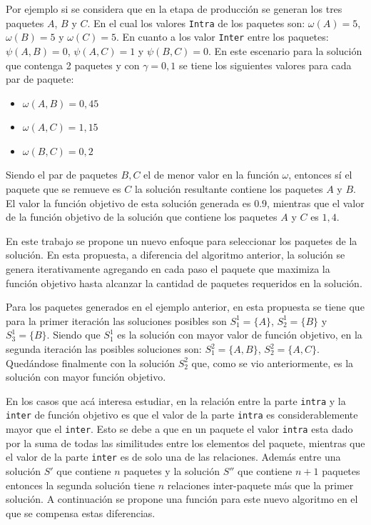 Por ejemplo si se considera que en la etapa de producción se generan los tres paquetes $A$, $B$ y $C$. En el cual los valores \texttt{Intra} de los paquetes son: $\omega(A) = 5$, $\omega(B) = 5$ y $\omega(C) = 5$. En cuanto a los valor \texttt{Inter} entre los paquetes:$\psi(A,B) = 0$, $\psi(A,C) = 1$ y $\psi(B,C) = 0$. En este escenario para la solución que contenga 2 paquetes y con $\gamma=0,1$ se tiene los siguientes valores para cada par de paquete:
\begin{itemize}
	\item $\omega(A,B) = 0,45$
	\item $\omega(A,C) = 1,15$
	\item $\omega(B,C) = 0,2$
\end{itemize}
 
Siendo el par de paquetes $B, C$ el de menor valor en la función $\omega$, entonces sí el paquete que se remueve es $C$ la solución resultante contiene los paquetes $A$ y $B$. El valor la función objetivo de esta solución generada es $0.9$, mientras que el valor de la función objetivo de la solución que contiene los paquetes $A$ y $C$ es $1,4$.

En este trabajo se propone un nuevo enfoque para seleccionar los paquetes de la solución. En esta propuesta, a diferencia del algoritmo anterior, la solución se genera iterativamente agregando en cada paso el paquete que maximiza la función objetivo hasta alcanzar la cantidad de paquetes requeridos en la solución.

Para los paquetes generados en el ejemplo anterior, en esta propuesta se tiene que para la primer iteración las soluciones posibles son $S^{1}_{1}=\{A\}$, $S^{1}_{2}=\{B\}$ y $S^{1}_{3}=\{B\}$. Siendo que $S^{1}_{1}$ es la solución con mayor valor de función objetivo, en la segunda iteración las posibles soluciones son:  $S^{2}_{1}=\{A,B\}$, $S^{2}_{2}=\{A,C\}$. Quedándose finalmente con la solución $S^{2}_{2}$ que, como se vio anteriormente, es la solución con mayor función objetivo.

En los casos que acá interesa estudiar, en la relación entre la parte \texttt{intra} y la \texttt{inter} de función objetivo es que el valor de la parte \texttt{intra} es considerablemente mayor que el \texttt{inter}. Esto se debe a que en un paquete el valor \texttt{intra} esta dado por la suma de todas las similitudes entre los elementos del paquete, mientras que el valor de la parte \texttt{inter} es de solo una de las relaciones. Además entre una solución $S'$ que contiene $n$ paquetes y la solución $S''$ que contiene $n+1$ paquetes entonces la segunda solución tiene $n$ relaciones inter-paquete más que la primer solución. A continuación se propone una función para este nuevo algoritmo en el que se compensa estas diferencias.

